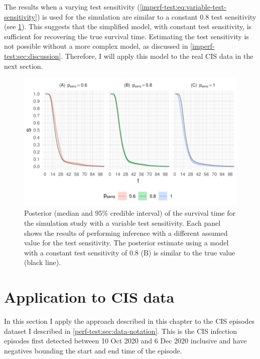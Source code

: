 \documentclass[thesis.tex]{subfiles}
\begin{document}
The results when a varying test sensitivity (\cref{imperf-test:eq:variable-test-sensitivity}) is used for the simulation are similar to a constant 0.8 test sensitivity (see \cref{imperf-test:fig:variable-test-sensitivity}).
This suggests that the simplified model, with constant test sensitivity, is sufficient for recovering the true survival time.
Estimating the test sensitivity is not possible without a more complex model, as discussed in \cref{imperf-test:sec:discussion}.
Therefore, I will apply this model to the real CIS data in the next section.
\begin{figure}
    \includegraphics[width=\textwidth]{cis-imperfect-testing/sim-variable-sensitivity}
  \caption[Simulation study results with varying test sensitivity]{%
    Posterior (median and 95\% credible interval) of the survival time for the simulation study with a variable test sensitivity.
    Each panel shows the results of performing inference with a different assumed value for the test sensitivity.
    The posterior estimate using a model with a constant test sensitivity of 0.8 (B) is similar to the true value (black line).
  }
  \label{imperf-test:fig:variable-test-sensitivity}
\end{figure}

\section{Application to CIS data} \label{imperf-test:sec:application}

In this section I apply the approach described in this chapter to the CIS episodes dataset I described in \cref{perf-test:sec:data-notation}.
This is the  CIS infection episodes first detected between 10 Oct 2020 and 6 Dec 2020 inclusive and have negatives bounding the start and end time of the episode.
\end{document}
